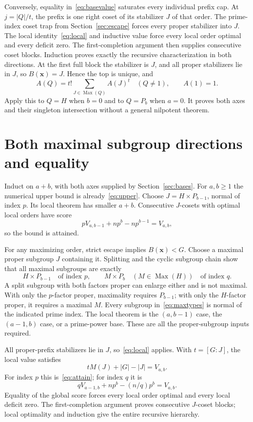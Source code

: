 \documentclass[11pt,letterpaper]{article}
\theoremstyle{definition}\newtheorem{definition}{Definition}
\newcommand{\Max}{\operatorname{Max}}
\begin{document}
Conversely, equality in~\eqref{eq:basevalue} saturates every individual prefix cap. At $j=|Q|/t$, the prefix is one right coset of its stabilizer $J$ of that order. The prime-index coset trap from Section~\ref{sec:escape} forces every proper stabilizer into $J$. The local identity~\eqref{eq:local} and inductive value force every local order optimal and every deficit zero. The first-completion argument then supplies consecutive coset blocks. Induction proves exactly the recursive characterization in both directions. At the first full block the stabilizer is $J$, and all proper stabilizers lie in $J$, so $B(\mathbf{x})=J$. Hence the top is unique, and
\[
A(Q)=t!\sum_{J\in\Max(Q)}A(J)^t\quad(Q\ne1),\qquad A(1)=1.
\]
Apply this to $Q=H$ when $b=0$ and to $Q=P_b$ when $a=0$. It proves both axes and their singleton intersection without a general nilpotent theorem.

\section{Both maximal subgroup directions and equality}\label{sec:equality}
Induct on $a+b$, with both axes supplied by Section~\ref{sec:bases}. For $a,b\ge1$ the numerical upper bound is already~\eqref{eq:upper}. Choose $J=H\times P_{b-1}$, normal of index $p$. Its local theorem has smaller $a+b$. Consecutive $J$-cosets with optimal local orders have score
\begin{equation}
pV_{a,b-1}+np^b-np^{b-1}=V_{a,b},\label{eq:attain}
\end{equation}
so the bound is attained.

For any maximizing order, strict escape implies $B(\mathbf{x})<G$. Choose a maximal proper subgroup $J$ containing it. Splitting and the cyclic subgroup chain show that all maximal subgroups are exactly
\begin{equation}
H\times P_{b-1}\quad\text{of index }p,
\qquad M\times P_b\quad(M\in\Max(H))\quad\text{of index }q.\label{eq:maxtypes}
\end{equation}
A split subgroup with both factors proper can enlarge either and is not maximal. With only the $p$-factor proper, maximality requires $P_{b-1}$; with only the $H$-factor proper, it requires a maximal $M$. Every subgroup in~\eqref{eq:maxtypes} is normal of the indicated prime index. The local theorem is the $(a,b-1)$ case, the $(a-1,b)$ case, or a prime-power base. These are all the proper-subgroup inputs required.

All proper-prefix stabilizers lie in $J$, so~\eqref{eq:local} applies. With $t=[G:J]$, the local value satisfies
\begin{equation}
tM(J)+|G|-|J|=V_{a,b}.\label{eq:bothvalues}
\end{equation}
For index $p$ this is~\eqref{eq:attain}; for index $q$ it is
\[
qV_{a-1,b}+np^b-(n/q)p^b=V_{a,b}.
\]
Equality of the global score forces every local order optimal and every local deficit zero. The first-completion argument proves consecutive $J$-coset blocks; local optimality and induction give the entire recursive hierarchy.
\end{document}

